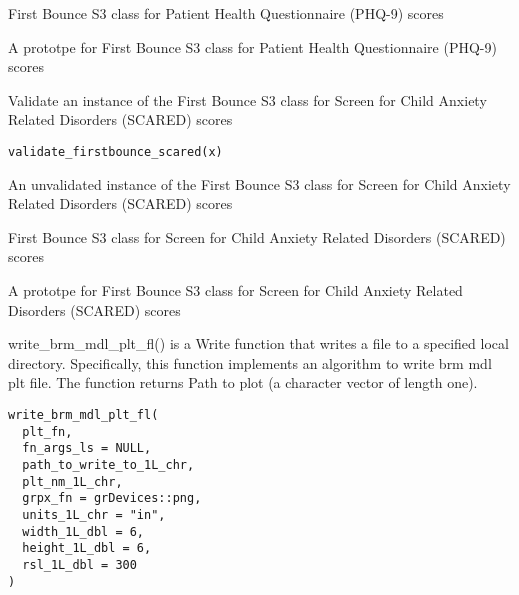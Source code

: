 \documentclass[a4paper]{book}
\begin{document}
%
\begin{Details}\relax
First Bounce S3 class for Patient Health Questionnaire (PHQ-9) scores
\end{Details}
%
\begin{Value}
A prototpe for First Bounce S3 class for Patient Health Questionnaire (PHQ-9) scores
\end{Value}
%
\begin{Description}\relax
Validate an instance of the First Bounce S3 class for Screen for Child Anxiety Related Disorders (SCARED) scores
\end{Description}
%
\begin{Usage}
\begin{verbatim}
validate_firstbounce_scared(x)
\end{verbatim}
\end{Usage}
%
\begin{Arguments}
\begin{ldescription}
\item[\code{x}] An unvalidated instance of the First Bounce S3 class for Screen for Child Anxiety Related Disorders (SCARED) scores
\end{ldescription}
\end{Arguments}
%
\begin{Details}\relax
First Bounce S3 class for Screen for Child Anxiety Related Disorders (SCARED) scores
\end{Details}
%
\begin{Value}
A prototpe for First Bounce S3 class for Screen for Child Anxiety Related Disorders (SCARED) scores
\end{Value}
%
\begin{Description}\relax
write\_brm\_mdl\_plt\_fl() is a Write function that writes a file to a specified local directory. Specifically, this function implements an algorithm to write brm mdl plt file. The function returns Path to plot (a character vector of length one).
\end{Description}
%
\begin{Usage}
\begin{verbatim}
write_brm_mdl_plt_fl(
  plt_fn,
  fn_args_ls = NULL,
  path_to_write_to_1L_chr,
  plt_nm_1L_chr,
  grpx_fn = grDevices::png,
  units_1L_chr = "in",
  width_1L_dbl = 6,
  height_1L_dbl = 6,
  rsl_1L_dbl = 300
)
\end{verbatim}
\end{Usage}
\end{document}
